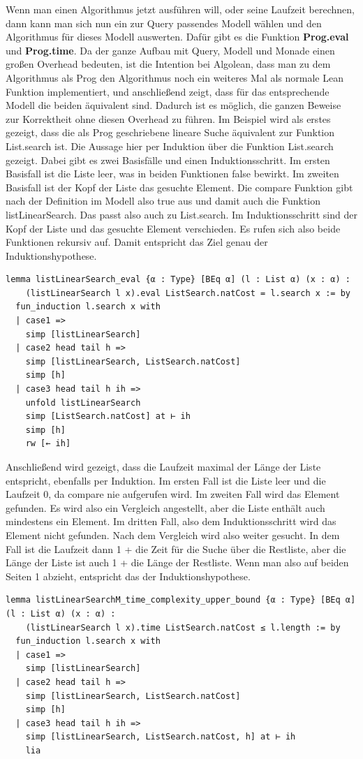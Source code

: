 Wenn man einen Algorithmus jetzt ausführen will, oder seine Laufzeit berechnen, dann kann man sich nun ein zur Query passendes Modell wählen und den Algorithmus für dieses Modell auswerten.
Dafür gibt es die Funktion \textbf{Prog.eval} und \textbf{Prog.time}.
Da der ganze Aufbau mit Query, Modell und Monade einen großen Overhead bedeuten, ist die Intention bei Algolean,
dass man zu dem Algorithmus als Prog den Algorithmus noch ein weiteres Mal als normale Lean Funktion implementiert,
und anschließend zeigt, dass für das entsprechende Modell die beiden äquivalent sind.
Dadurch ist es möglich, die ganzen Beweise zur Korrektheit ohne diesen Overhead zu führen.
Im Beispiel wird als erstes gezeigt, dass die als Prog geschriebene lineare Suche äquivalent zur Funktion List.search ist.
Die Aussage hier per Induktion über die Funktion List.search gezeigt.
Dabei gibt es zwei Basisfälle und einen Induktionsschritt.
Im ersten Basisfall ist die Liste leer, was in beiden Funktionen false bewirkt.
Im zweiten Basisfall ist der Kopf der Liste das gesuchte Element.
Die compare Funktion gibt nach der Definition im Modell also true aus und damit auch die Funktion listLinearSearch.
Das passt also auch zu List.search.
Im Induktionsschritt sind der Kopf der Liste und das gesuchte Element verschieden.
Es rufen sich also beide Funktionen rekursiv auf.
Damit entspricht das Ziel genau der Induktionshypothese.
\begin{lstlisting}
lemma listLinearSearch_eval {α : Type} [BEq α] (l : List α) (x : α) :
    (listLinearSearch l x).eval ListSearch.natCost = l.search x := by
  fun_induction l.search x with
  | case1 =>
    simp [listLinearSearch]
  | case2 head tail h =>
    simp [listLinearSearch, ListSearch.natCost]
    simp [h]
  | case3 head tail h ih =>
    unfold listLinearSearch
    simp [ListSearch.natCost] at ⊢ ih
    simp [h]
    rw [← ih]
\end{lstlisting}

Anschließend wird gezeigt, dass die Laufzeit maximal der Länge der Liste entspricht, ebenfalls per Induktion.
Im ersten Fall ist die Liste leer und die Laufzeit 0, da compare nie aufgerufen wird.
Im zweiten Fall wird das Element gefunden.
Es wird also ein Vergleich angestellt, aber die Liste enthält auch mindestens ein Element.
Im dritten Fall, also dem Induktionsschritt wird das Element nicht gefunden.
Nach dem Vergleich wird also weiter gesucht.
In dem Fall ist die Laufzeit dann 1 + die Zeit für die Suche über die Restliste, aber die Länge der Liste ist auch 1 + die Länge der Restliste.
Wenn man also auf beiden Seiten 1 abzieht, entspricht das der Induktionshypothese.
\begin{lstlisting}
lemma listLinearSearchM_time_complexity_upper_bound {α : Type} [BEq α] (l : List α) (x : α) :
    (listLinearSearch l x).time ListSearch.natCost ≤ l.length := by
  fun_induction l.search x with
  | case1 =>
    simp [listLinearSearch]
  | case2 head tail h =>
    simp [listLinearSearch, ListSearch.natCost]
    simp [h]
  | case3 head tail h ih =>
    simp [listLinearSearch, ListSearch.natCost, h] at ⊢ ih
    lia
\end{lstlisting}

